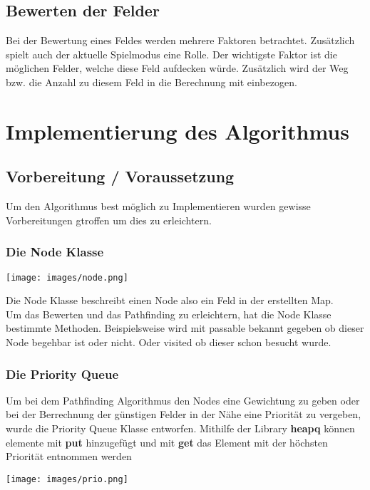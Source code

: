 \subsection{Bewerten der Felder}
Bei der Bewertung eines Feldes werden mehrere Faktoren betrachtet.
Zusätzlich spielt auch der aktuelle Spielmodus eine Rolle.
Der wichtigste Faktor ist die möglichen Felder, welche diese Feld aufdecken würde. Zusätzlich wird der Weg bzw. die Anzahl zu diesem Feld in die Berechnung mit einbezogen.

\section{Implementierung des Algorithmus}

\subsection{Vorbereitung / Voraussetzung}
Um den Algorithmus best möglich zu Implementieren wurden gewisse Vorbereitungen gtroffen um dies zu erleichtern.

\subsubsection{Die Node Klasse}
\begin{minipage}{.5\textwidth}
\begin{center}
	\texttt{[image: images/node.png]}
\end{center}
\end{minipage}%
\begin{minipage}{.5\textwidth}
Die Node Klasse beschreibt einen Node also ein Feld in der erstellten Map.\\

Um das Bewerten und das Pathfinding zu erleichtern, hat die Node Klasse bestimmte Methoden.
Beispielsweise wird mit passable bekannt gegeben ob dieser Node begehbar ist oder nicht. Oder visited ob dieser schon besucht wurde.
\end{minipage}

\subsubsection{Die Priority Queue}
\begin{minipage}{.5\textwidth}
	Um bei dem Pathfinding Algorithmus den Nodes eine Gewichtung zu geben oder bei der Berrechnung der günstigen Felder in der Nähe eine Priorität zu vergeben, wurde die Priority Queue Klasse entworfen.
	Mithilfe der Library \textbf{heapq} können elemente mit \textbf{put} hinzugefügt und mit \textbf{get} das Element mit der höchsten Priorität entnommen werden
\end{minipage}
\begin{minipage}{.5\textwidth}
	\begin{center}
		\texttt{[image: images/prio.png]}
	\end{center}
\end{minipage}%


